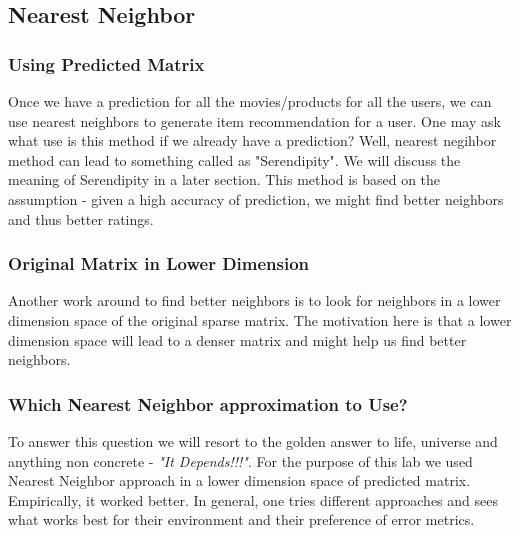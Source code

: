\documentclass{article}
\begin{document}
  \subsection{Nearest Neighbor}
  \subsubsection{Using Predicted Matrix}
  Once we have a prediction for all the movies/products for all the users, we can use nearest neighbors to generate item recommendation for a user. One may ask what use is this method if we already have a prediction? Well, nearest negihbor method can lead to something called as "Serendipity". We will discuss the meaning of Serendipity in a later section. This method is based on the assumption - given a high accuracy of prediction, we might find better neighbors and thus better ratings.
  \subsubsection{Original Matrix in Lower Dimension}
  Another work around to find better neighbors is to look for neighbors in a lower dimension space of the original sparse matrix. The motivation here is that a lower dimension space will lead to a denser matrix and might help us find better neighbors.
  \subsubsection{Which Nearest Neighbor approximation to Use?}
  To answer this question we will resort to the golden answer to life, universe and anything non concrete - \textit{"It Depends!!!"}. For the purpose of this lab we used Nearest Neighbor approach in a lower dimension space of predicted matrix. Empirically, it worked better. In general, one tries different approaches and sees what works best for their environment and their preference of error metrics.
\end{document}

